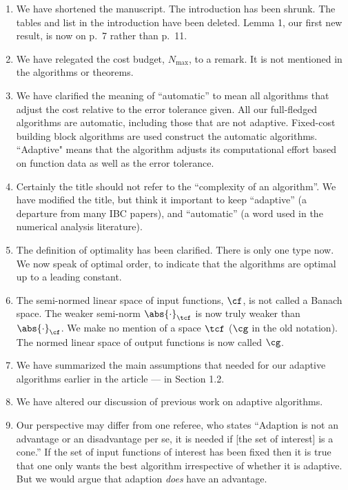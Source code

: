 \documentclass[11pt]{article}
\newcommand{\Fnorm}[1]{\abs{#1}_{\cf}}
\newcommand{\Ftnorm}[1]{\abs{#1}_{\tcf}}
\begin{document}
\begin{enumerate}
\renewcommand{\labelenumi}{\arabic{enumi}.}

\item We have shortened the manuscript.  The introduction has been shrunk. The tables and list in the introduction have been deleted.  Lemma 1, our first new result, is now on p.\ 7 rather than p.\ 11.  

\item We have relegated the cost budget, $N_{\max}$, to a remark.  It is not mentioned in the algorithms or theorems.

\item We have clarified the meaning of ``automatic'' to mean all algorithms that adjust the cost relative to the error tolerance given.  All our full-fledged algorithms are automatic, including those that are not adaptive.  Fixed-cost building block algorithms are used construct the automatic algorithms.  ``Adaptive" means that the algorithm adjusts its computational effort based on function data as well as the error tolerance.

\item Certainly the title should not refer to the ``complexity of an algorithm''.  We have modified the title, but think it important to keep ``adaptive'' (a departure from many IBC papers), and ``automatic'' (a word used in the numerical analysis literature).

\item The definition of optimality has been clarified.  There is only one type now.  We now speak of optimal order, to indicate that the algorithms are optimal up to a leading constant.

\item The semi-normed linear space of input functions, $\cf$, is not called a Banach space.  The weaker semi-norm $\Ftnorm{\cdot}$ is now truly weaker than $\Fnorm{\cdot}$.  We make no mention of a space $\tcf$ ($\cg$ in the old notation).  The normed linear space of output functions is now called $\cg$.

\item We have summarized the main assumptions that needed for our adaptive algorithms earlier in the article --- in Section 1.2.

\item We have altered our discussion of previous work on adaptive algorithms.

\item Our perspective may differ from one referee, who states ``Adaption is not an advantage or an disadvantage per se, it is needed if [the set of interest] is a cone.'' If the set of input functions of interest has been fixed then it is true that one only wants the best algorithm irrespective of whether it is adaptive.  But we would argue that adaption \emph{does} have an advantage.


\end{enumerate}
\end{document}
